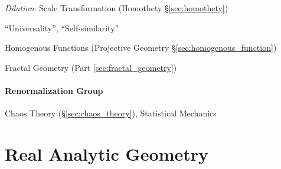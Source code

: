 \emph{Dilation}: Scale Transformation (Homothety \S\ref{sec:homothety})

``Universality'', ``Self-similarity''

\fist Homogenous Functions (Projective Geometry
\S\ref{sec:homogenous_function})

\fist Fractal Geometry (Part \ref{sec:fractal_geometry})



\paragraph{Renormalization Group}\label{sec:renormalization_group}\hfill

Chaos Theory (\S\ref{sec:chaos_theory}), Statistical Mechanics



\section{Real Analytic Geometry}\label{sec:real_analytic_geometry}
